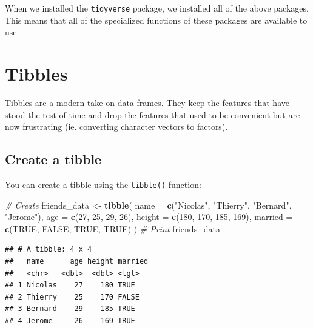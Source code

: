 \documentclass[
]{book}
\newenvironment{Shaded}{\begin{snugshade}}{\end{snugshade}}
\newcommand{\AttributeTok}[1]{\textcolor[rgb]{0.13,0.29,0.53}{#1}}
\newcommand{\CommentTok}[1]{\textcolor[rgb]{0.56,0.35,0.01}{\textit{#1}}}
\newcommand{\ConstantTok}[1]{\textcolor[rgb]{0.56,0.35,0.01}{#1}}
\newcommand{\DecValTok}[1]{\textcolor[rgb]{0.00,0.00,0.81}{#1}}
\newcommand{\FunctionTok}[1]{\textcolor[rgb]{0.13,0.29,0.53}{\textbf{#1}}}
\newcommand{\NormalTok}[1]{#1}
\newcommand{\OtherTok}[1]{\textcolor[rgb]{0.56,0.35,0.01}{#1}}
\newcommand{\StringTok}[1]{\textcolor[rgb]{0.31,0.60,0.02}{#1}}
\begin{document}
When we installed the \texttt{tidyverse} package, we installed all of the above packages. This means that all of the specialized functions of these packages are available to use.

\section{Tibbles}\label{tibbles}

Tibbles are a modern take on data frames. They keep the features that have stood the test of time and drop the features that used to be convenient but are now frustrating (ie. converting character vectors to factors).

\subsection*{Create a tibble}\label{create-a-tibble}

You can create a tibble using the \texttt{tibble()} function:

\begin{Shaded}
\begin{Highlighting}[]
\CommentTok{\# Create}
\NormalTok{friends\_data }\OtherTok{\textless{}{-}} \FunctionTok{tibble}\NormalTok{(}
  \AttributeTok{name =} \FunctionTok{c}\NormalTok{(}\StringTok{"Nicolas"}\NormalTok{, }\StringTok{"Thierry"}\NormalTok{, }\StringTok{"Bernard"}\NormalTok{, }\StringTok{"Jerome"}\NormalTok{),}
  \AttributeTok{age =} \FunctionTok{c}\NormalTok{(}\DecValTok{27}\NormalTok{, }\DecValTok{25}\NormalTok{, }\DecValTok{29}\NormalTok{, }\DecValTok{26}\NormalTok{),}
  \AttributeTok{height =} \FunctionTok{c}\NormalTok{(}\DecValTok{180}\NormalTok{, }\DecValTok{170}\NormalTok{, }\DecValTok{185}\NormalTok{, }\DecValTok{169}\NormalTok{),}
  \AttributeTok{married =} \FunctionTok{c}\NormalTok{(}\ConstantTok{TRUE}\NormalTok{, }\ConstantTok{FALSE}\NormalTok{, }\ConstantTok{TRUE}\NormalTok{, }\ConstantTok{TRUE}\NormalTok{)}
\NormalTok{)}
\CommentTok{\# Print}
\NormalTok{friends\_data}
\end{Highlighting}
\end{Shaded}

\begin{verbatim}
## # A tibble: 4 x 4
##   name      age height married
##   <chr>   <dbl>  <dbl> <lgl>  
## 1 Nicolas    27    180 TRUE   
## 2 Thierry    25    170 FALSE  
## 3 Bernard    29    185 TRUE   
## 4 Jerome     26    169 TRUE
\end{verbatim}
\end{document}
